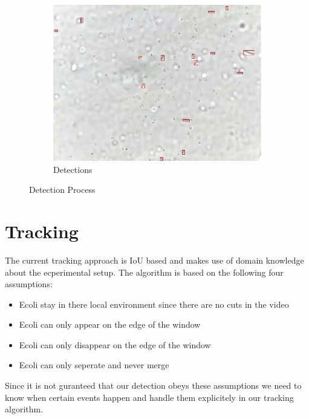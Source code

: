 \documentclass{article}
\begin{document}
\begin{figure}
    \begin{subfigure}[b]{.45\linewidth}
    \includegraphics[width=\linewidth]{boxes.jpg}
    \caption{Detections}\label{fig:detecions}
    \end{subfigure}
    \caption{Detection Process}
\end{figure}

\section{Tracking}
The current tracking approach is IoU based and makes use of domain knowledge
about the ecperimental setup. The algorithm is based on the following four assumptions:
\begin{itemize}
    \item Ecoli stay in there local environment since there are no cuts
    in the video
    \item Ecoli can only appear on the edge of the window
    \item Ecoli can only disappear on the edge of the window
    \item Ecoli can only seperate and never merge
\end{itemize}
Since it is not guranteed that our detection obeys these assumptions we need to know
when certain events happen and handle them explicitely in our tracking algorithm.
\end{document}
